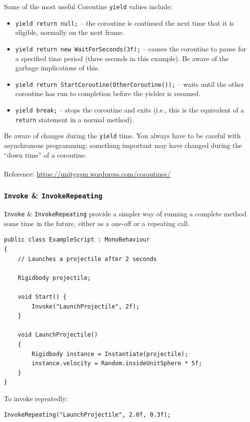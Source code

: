 \documentclass[a4paper,11pt]{article}
\begin{document}
Some of the most useful Coroutine \verb|yield| values include:
\begin{itemize}
    \item   \verb|yield return null;| -- the coroutine is continued the next time that it is eligible, normally on the
            next frame.
    \item   \verb|yield return new WaitForSeconds(3f);| -- causes the coroutine to pause for a specified time period (three
            seconds in this example). Be aware of the garbage implications of this.
    \item   \verb|yield return StartCoroutine(OtherCoroutine());| -- waits until the other coroutine has run to completion
            before the yielder is resumed.
    \item   \verb|yield break;| -- stops the coroutine and exits (i.e., this is the equivalent of a \verb|return| statement
            in a normal method).
\end{itemize}

Be aware of changes during the \verb|yield| time. 
You always have to be careful with asynchronous programming: something important may have changed during the ``down time''
of a coroutine.
\\\\
Reference: \url{https://unitygem.wordpress.com/coroutines/}

\subsubsection{\texttt{Invoke} \& \texttt{InvokeRepeating}}
\verb|Invoke| \& \verb|InvokeRepeating| provide a simpler way of running a complete method some time in the future, either 
as a one-off or a repeating call.
\begin{verbatim}
public class ExampleScript : MonoBehaviour
{
    // Launches a projectile after 2 seconds

    Rigidbody projectile;

    void Start() {
        Invoke("LaunchProjectile", 2f);
    }

    void LaunchProjectile()
    {
        Rigidbody instance = Instantiate(projectile);
        instance.velocity = Random.insideUnitSphere * 5f;
    }
}
\end{verbatim}

To invoke repeatedly:
\begin{verbatim}
InvokeRepeating("LaunchProjectile", 2.0f, 0.3f);
\end{verbatim}
\end{document}
